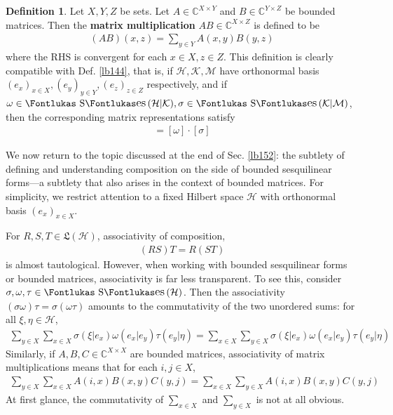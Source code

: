 \documentclass[12pt,b5paper,notitlepage]{article}
\theoremstyle{definition}
\newtheorem{df}{Definition}[subsection]
\theoremstyle{plain}
\DeclareMathOperator{\Ses}{\text{\Fontlukas S}\text{\kern -0pt {\Fontlukas\large es}}\,}
\newcommand{\fk}{\mathfrak}
\newcommand{\Cbb}{\mathbb C}
\newcommand{\MH}{\mathcal H}
\newcommand{\MK}{\mathcal K}
\newcommand{\MM}{\mathcal M}
\numberwithin{equation}{section}
\begin{document}
\begin{df}
Let $X,Y,Z$ be sets. Let $A\in\Cbb^{X\times Y}$ and $B\in\Cbb^{Y\times Z}$ be bounded matrices. Then the \textbf{matrix multiplication} $AB\in\Cbb^{X\times Z}$  is defined to be
\begin{align*}
(AB)(x,z)=\sum_{y\in Y}A(x,y)B(y,z)
\end{align*}
where the RHS is convergent for each $x\in X,z\in Z$. This definition is clearly compatible with Def. \ref{lb144}, that is, if $\MH,\MK,\MM$ have orthonormal basis $(e_x)_{x\in X},(e_y)_{y\in Y},(e_z)_{z\in Z}$ respectively, and if $\omega\in\Ses(\MH|\MK),\sigma\in\Ses(\MK|\MM)$, then the corresponding matrix representations satisfy
\begin{align*}
[\omega\circ\sigma]=[\omega]\cdot[\sigma]
\end{align*}
\end{df}


We now return to the topic discussed at the end of Sec. \ref{lb152}: the subtlety of defining and understanding composition on the side of bounded sesquilinear forms---a subtlety that also arises in the context of bounded matrices. For simplicity, we restrict attention to a fixed Hilbert space $\MH$ with orthonormal basis $(e_x)_{x\in X}$. 

For $R,S,T\in\fk L(\MH)$, associativity of composition,
\begin{align*}
(RS)T=R(ST)
\end{align*}
is almost tautological. However, when working with bounded sesquilinear forms or bounded matrices, associativity is far less transparent. To see this, consider $\sigma,\omega,\tau\in\Ses(\MH)$. Then the associativity $(\sigma\omega)\tau=\sigma(\omega\tau)$ amounts to the commutativity of the two unordered sums: for all $\xi,\eta\in\MH$,
\begin{align}\label{eq78}
\sum_{y\in X}\sum_{x\in X} \sigma(\xi|e_x)\omega(e_x|e_y)\tau(e_y|\eta)=\sum_{x\in X}\sum_{y\in X}\sigma(\xi|e_x)\omega(e_x|e_y)\tau(e_y|\eta)
\end{align}
Similarly, if $A,B,C\in\Cbb^{X\times X}$ are bounded matrices, associativity of matrix multiplications means that for each $i,j\in X$, 
\begin{align*}
\sum_{y\in X}\sum_{x\in X} A(i,x)B(x,y)C(y,j)=\sum_{x\in X}\sum_{y\in X}A(i,x)B(x,y)C(y,j)
\end{align*}
At first glance, the commutativity of $\sum_{x\in X}$ and $\sum_{y\in X}$ is not at all obvious.
\end{document}
